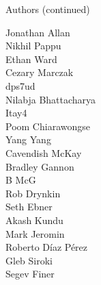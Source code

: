 \begin{frame}{Authors (continued)}
\begin{multicols}{5}
Jonathan Allan\\
Nikhil Pappu\\
Ethan Ward\\
Cezary Marczak\\
dps7ud\\
Nilabja Bhattacharya\\
Itay4\\
Poom Chiarawongse\\
Yang Yang\\
Cavendish McKay\\
Bradley Gannon\\
B McG\\
Rob Drynkin\\
Seth Ebner\\
Akash Kundu\\
Mark Jeromin\\
Roberto Díaz Pérez\\
Gleb Siroki\\
Segev Finer\\
\end{multicols}
\end{frame}
